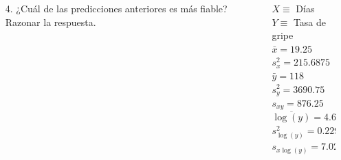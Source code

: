 \documentclass[aspectratio=149,10pt,t]{beamer}
\begin{document}
\begin{frame}
	\begin{columns}
		\begin{column}[T]{0.64\textwidth}
			\begin{enumerate}
				\item[4.] ¿Cuál de las predicciones anteriores es más fiable?
			Razonar la respuesta.			\end{enumerate}
		\end{column}
		\begin{column}[T]{0.36\textwidth}
			\begin{datos}
				$X\equiv$ Días\\
				$Y\equiv$ Tasa de gripe\\
				$\bar x=19.25$\\ 
				$s_x^2=215.6875$\\ 
				$\bar y=118$\\
				$s_y^2=3690.75$\\
				$s_{xy}=876.25$\\
				$\overline{\log(y)}=4.6503$\\
				$s_{\log(y)}^2=0.2293$\\
				$s_{x\log(y)}=7.0255$
			\end{datos}
		\end{column}
	\end{columns}
\end{frame}
\end{document}
